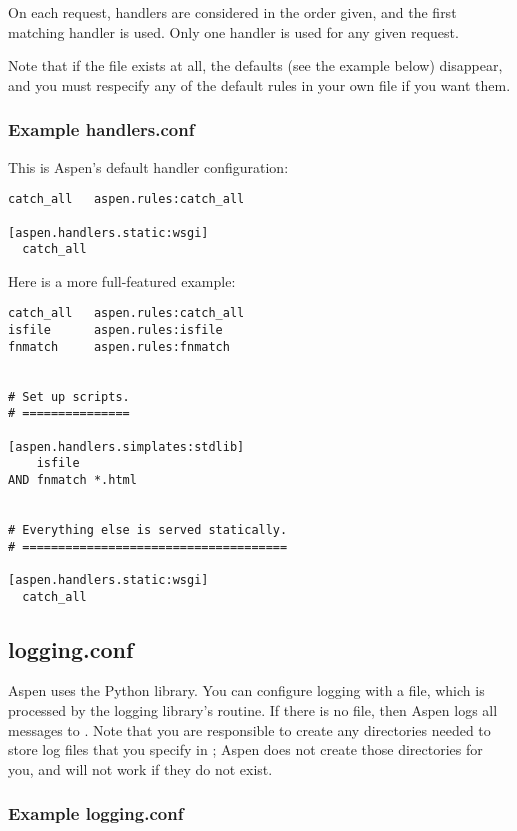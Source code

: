 On each request, handlers are considered in the order given, and the first
matching handler is used. Only one handler is used for any given request.

Note that if the file  exists at all, the defaults
(see the example below) disappear, and you must respecify any of the default
rules in your own file if you want them.


\subsubsection{Example handlers.conf}
This is Aspen's default handler configuration:

\begin{verbatim}
catch_all   aspen.rules:catch_all

[aspen.handlers.static:wsgi]
  catch_all
\end{verbatim}


Here is a more full-featured example:

\begin{verbatim}
catch_all   aspen.rules:catch_all
isfile      aspen.rules:isfile
fnmatch     aspen.rules:fnmatch


# Set up scripts.
# ===============

[aspen.handlers.simplates:stdlib]
    isfile
AND fnmatch *.html


# Everything else is served statically.
# =====================================

[aspen.handlers.static:wsgi]
  catch_all
\end{verbatim}

\subsection{logging.conf}
\label{logging-conf}

Aspen uses the Python  library. You can configure logging with
a  file, which is processed by the logging library's
 routine. If there is no  file, then Aspen
logs all messages to . Note that you are responsible to create
any directories needed to store log files that you specify in
; Aspen does not create those directories for you, and will
not work if they do not exist.


\subsubsection{Example logging.conf}

